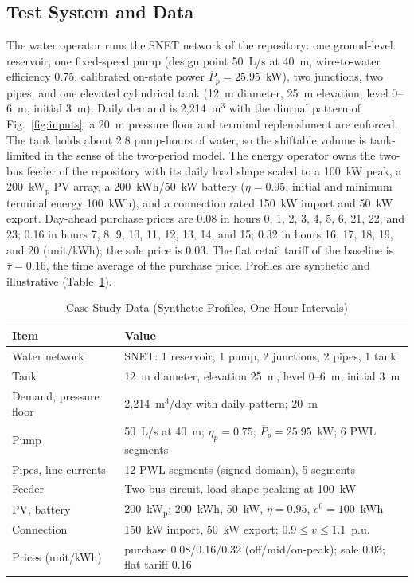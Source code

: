 \subsection{Test System and Data}
The water operator runs the SNET network of the repository: one ground-level reservoir, one fixed-speed pump
(design point 50~L/s at 40~m, wire-to-water efficiency 0.75, calibrated on-state power $\overline{P}_p=25.95$~kW),
two junctions, two pipes, and one elevated cylindrical tank (12~m diameter, 25~m
elevation, level 0--6~m, initial 3~m). Daily
demand is 2,214~m$^3$ with the diurnal pattern of Fig.~\ref{fig:inputs}; a 20~m pressure
floor and terminal replenishment are enforced. The tank holds about 2.8 pump-hours of water, so
the shiftable volume is tank-limited in the sense of the two-period model. The energy operator owns the two-bus feeder of the
repository with its daily load shape scaled to a 100~kW peak, a 200~kW$_\mathrm{p}$
PV array, a 200~kWh/50~kW battery ($\eta=0.95$, initial and minimum terminal energy 100~kWh), and a connection rated
150~kW import and 50~kW export. Day-ahead purchase prices are 0.08 in hours 0, 1, 2, 3, 4, 5, 6, 21, 22, and 23; 0.16 in hours 7, 8, 9, 10, 11, 12, 13, 14, and 15; 0.32 in hours 16, 17, 18, 19, and 20
(unit/kWh); the sale price is 0.03. The flat retail tariff of the baseline is $\bar\tau=0.16$, the
time average of the purchase price. Profiles are synthetic and illustrative (Table~\ref{tab:case}).

\begin{table}[!t]
\caption{Case-Study Data (Synthetic Profiles, One-Hour Intervals)}
\label{tab:case}
\centering
\footnotesize
\setlength{\tabcolsep}{4pt}
\begin{tabular}{@{}lp{5.4cm}@{}}
\toprule
Item & Value \\
\midrule
Water network & SNET: 1 reservoir, 1 pump, 2 junctions, 2 pipes, 1 tank \\
Tank & 12~m diameter, elevation 25~m, level 0--6~m, initial 3~m \\
Demand, pressure floor & 2,214~m$^3$/day with daily pattern; 20~m \\
Pump & 50~L/s at 40~m; $\eta_p=0.75$; $\overline{P}_p=25.95$~kW; 6 PWL segments \\
Pipes, line currents & 12 PWL segments (signed domain), 5 segments \\
Feeder & Two-bus circuit, load shape peaking at 100~kW \\
PV, battery & 200~kW$_\mathrm{p}$; 200~kWh, 50~kW, $\eta=0.95$, $e^0=100$~kWh \\
Connection & 150~kW import, 50~kW export; $0.9\le v\le1.1$~p.u. \\
Prices (unit/kWh) & purchase 0.08/0.16/0.32 (off/mid/on-peak); sale 0.03; flat tariff 0.16 \\
\bottomrule
\end{tabular}
\end{table}

